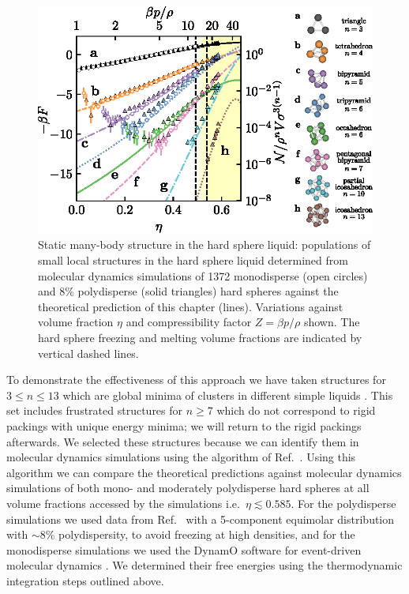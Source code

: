 \documentclass[11pt,twoside]{report}
\begin{document}
\begin{figure}
  \includegraphics[width=\linewidth,center]{structure-populations}
  \caption[Concentration of local structures in the equilibrium liquid]{
    Static many-body structure in the hard sphere liquid: populations of small local structures in the hard sphere liquid determined from molecular dynamics simulations of 1372 monodisperse (open circles) and 8\% polydisperse (solid triangles) hard spheres against the theoretical prediction of this chapter (lines).
    Variations against volume fraction $\eta$ and compressibility factor $Z = \beta p/\rho$ shown.
    The hard sphere freezing and melting volume fractions are indicated by vertical dashed lines.
  }
  \label{fig:structure-populations}
\end{figure}

To demonstrate the effectiveness of this approach we have taken structures for $3 \le n \le 13$ which are global minima of clusters in different simple liquids \cite{Wales2004}.
This set includes frustrated structures for $n \ge 7$ which do not correspond to rigid packings with unique energy minima; we will return to the rigid packings afterwards.
We selected these structures because we can identify them in molecular dynamics simulations using the algorithm of Ref.\ \cite{MalinsTCC2013}.
Using this algorithm we can compare the theoretical predictions against molecular dynamics simulations of both mono- and moderately polydisperse hard spheres at all volume fractions accessed by the simulations i.e.\ $\eta \lesssim 0.585$.
For the polydisperse simulations we used data from Ref.\ \cite{RoyallJSM2017} with a 5-component equimolar distribution with $\sim8\%$ polydispersity, to avoid freezing at high densities, and for the monodisperse simulations we used the DynamO software for event-driven molecular dynamics \cite{BannermanJCC2011}.
We determined their free energies using the thermodynamic integration steps outlined above.
\end{document}
